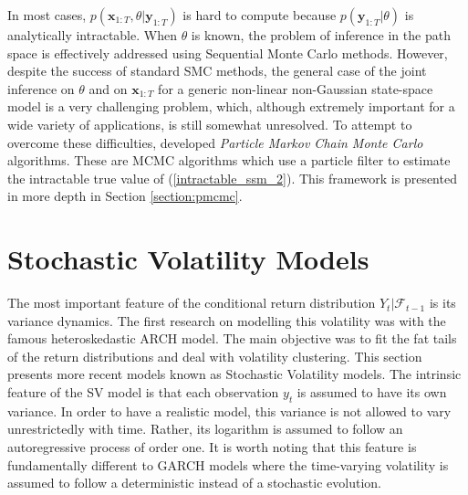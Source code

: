 \documentclass[11pt,a4,twosided,singlespacing,titlepagenumber=on]{scrreprt}
\numberwithin{equation}{chapter} %
\theoremstyle{remark}
\newcommand{\matr}[1]{\mathbf{#1}}
\begin{document}
In most cases, $p(\matr{x}_{1:T}, \theta | \matr{y}_{1:T})$ is hard to compute because $p(\matr{y}_{1:T} | \theta)$ is analytically intractable. When $\theta$ is known, the problem of inference in the path space is effectively addressed using Sequential Monte Carlo methods. However, despite the success of standard SMC methods, the general case of the joint inference on $\theta$ and on $\matr{x}_{1:T}$ for a generic non-linear non-Gaussian state-space model is a very challenging problem, which, although extremely important for a wide variety of applications, is still somewhat unresolved. To attempt to overcome these difficulties, \cite{andrieu2010} developed \textit{Particle Markov Chain Monte Carlo} algorithms. These are MCMC algorithms which use a particle filter to estimate the intractable true value of (\ref{intractable_ssm_2}). This framework is presented in more depth in Section \ref{section:pmcmc}.

\section{Stochastic Volatility Models}
\label{sec:sv}
The most important feature of the conditional return distribution $Y_t | \mathcal{F}_{t-1}$ is its variance dynamics. The first research on modelling this volatility was \cite{engle1982} with the famous heteroskedastic ARCH model. The main objective was to fit the fat tails of the return distributions and deal with volatility clustering. This section presents more recent models known as Stochastic Volatility models. The intrinsic feature of the SV model is that each observation $y_t$ is assumed to have its own variance. In order to have a realistic model, this variance is not allowed to vary unrestrictedly with time. Rather, its logarithm is assumed to follow an autoregressive process of order one. It is worth noting that this feature is fundamentally different to GARCH models where the time-varying volatility is assumed to follow a deterministic instead of a stochastic evolution.
\end{document}
